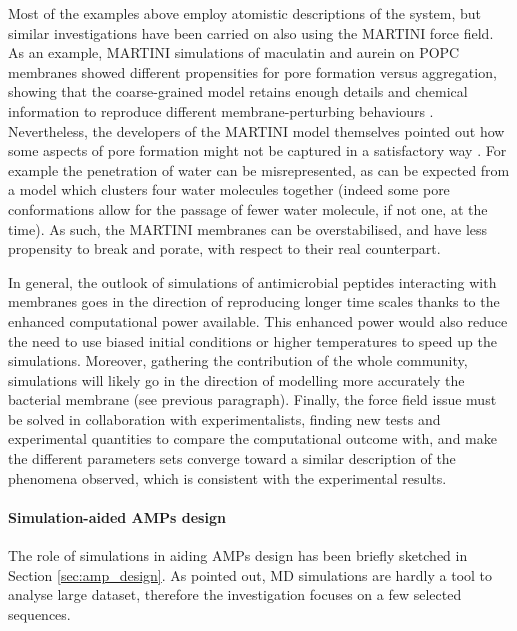 Most of the examples above employ atomistic descriptions of the system, but similar investigations have been carried on also using the MARTINI force field. %
%
As an example, MARTINI simulations of maculatin and aurein on POPC membranes showed different propensities for pore formation versus aggregation, showing that the coarse-grained model retains enough details and chemical information to reproduce different membrane-perturbing behaviours \citep{Balatti2017}.
%
Nevertheless, the developers of the MARTINI model themselves pointed out how some aspects of pore formation might not be captured in a satisfactory way \citep{Marrink2013}. For example the penetration of water can be misrepresented, as can be expected from a model which clusters four water molecules together (indeed some pore conformations allow for the passage of fewer water molecule, if not one, at the time). As such, the MARTINI membranes can be overstabilised, and have less propensity to break and porate, with respect to their real counterpart.

In general, the outlook of simulations of antimicrobial peptides interacting with membranes goes in the direction of reproducing longer time scales thanks to the enhanced computational power available. %
%
This enhanced power would also reduce the need to use biased initial conditions or higher temperatures to speed up the simulations.
%
Moreover, gathering the contribution of the whole community, simulations will likely go in the direction of modelling more accurately the bacterial membrane (see previous paragraph). %
%
Finally, the force field issue must be solved in collaboration with experimentalists, finding new tests and experimental quantities to compare the computational outcome with, and make the different parameters sets converge toward a similar description of the phenomena observed, which is consistent with the experimental results.


\paragraph{Simulation-aided AMPs design} \label{sec:design_md_examples}

The role of simulations in aiding AMPs design has been briefly sketched in Section \ref{sec:amp_design}. As pointed out, MD simulations are hardly a tool to analyse large dataset, therefore %
the investigation focuses on a few selected sequences.


